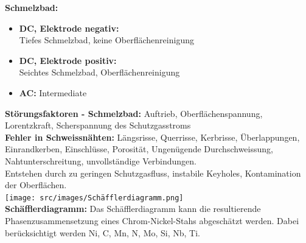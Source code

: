 \textbf{Schmelzbad:} 
\begin{itemize}
    \item \textbf{DC, Elektrode negativ:} \\Tiefes Schmelzbad, keine Oberflächenreinigung
    \item \textbf{DC, Elektrode positiv:} \\Seichtes Schmelzbad, Oberflächenreinigung
    \item \textbf{AC:} Intermediate
\end{itemize}

\textbf{Störungsfaktoren - Schmelzbad:} Auftrieb, Oberflächenspannung, Lorentzkraft, Scherspannung des Schutzgasstroms\\

\textbf{Fehler in Schweissnähten:} Längsrisse, Querrisse, Kerbrisse, 
Überlappungen, Einrandkerben, Einschlüsse, Porosität, Ungenügende 
Durchschweissung, Nahtunterschreitung, unvollständige Verbindungen. \\
Entstehen durch zu geringen Schutzgasfluss, instabile Keyholes, 
Kontamination der Oberflächen.\\
\texttt{[image: src/images/Schäfflerdiagramm.png]}\\

\textbf{Schäfflerdiagramm:} Das Schäfflerdiagramm kann die resultierende 
Phasenzusammensetzung eines Chrom-Nickel-Stahs abgeschätzt werden. 
Dabei berücksichtigt werden Ni, C, Mn, N, Mo, Si, Nb, Ti.\\





